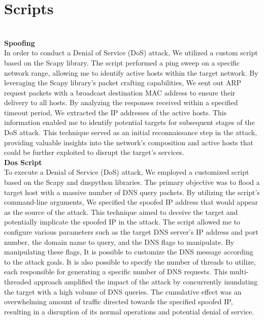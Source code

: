 \section{Scripts}
\\
\textbf{Spoofing}\\
In order to conduct a Denial of Service (DoS) attack, We utilized a custom script based on the Scapy library. The script performed a ping sweep on a specific network range, allowing me to identify active hosts within the target network. By leveraging the Scapy library's packet crafting capabilities, We sent out ARP request packets with a broadcast destination MAC address to ensure their delivery to all hosts. By analyzing the responses received within a specified timeout period, We extracted the IP addresses of the active hosts. This information enabled me to identify potential targets for subsequent stages of the DoS attack. This technique served as an initial reconnaissance step in the attack, providing valuable insights into the network's composition and active hosts that could be further exploited to disrupt the target's services.
\\
\textbf{Dos Script}\\
To execute a Denial of Service (DoS) attack, We employed a customized script based on the Scapy and dnspython libraries. The primary objective was to flood a target host with a massive number of DNS query packets. By utilizing the script's command-line arguments, We specified the spoofed IP address that would appear as the source of the attack. This technique aimed to deceive the target and potentially implicate the spoofed IP in the attack. The script allowed me to configure various parameters such as the target DNS server's IP address and port number, the domain name to query, and the DNS flags to manipulate. By manipulating these flags, It is possible to customize the DNS message according to the attack goals. It is also possible to specify the number of threads to utilize, each responsible for generating a specific number of DNS requests. This multi-threaded approach amplified the impact of the attack by concurrently inundating the target with a high volume of DNS queries. The cumulative effect was an overwhelming amount of traffic directed towards the specified spoofed IP, resulting in a disruption of its normal operations and potential denial of service.
